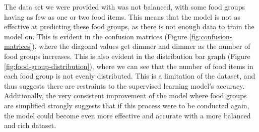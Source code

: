 \documentclass[11pt]{article}
\begin{document}
The data set we were provided with was not balanced, with some food groups having as few as one or two food items. This means that the model is not as effective at predicting these food groups, as there is not enough data to train the model on. This is evident in the confusion matrices (Figure \ref{fig:confusion-matrices}), where the diagonal values get dimmer and dimmer as the number of food groups increases. This is also evident in the distribution bar graph (Figure \ref{fig:food-group-distribution}), where we can see that the number of food items in each food group is not evenly distributed. This is a limitation of the dataset, and thus suggests there are restraints to the supervised learning model's accuracy. Additionally, the very consistent improvement of the model where food groups are simplified strongly suggests that if this process were to be conducted again, the model could become even more effective and accurate with a more balanced and rich dataset.




\newpage


\end{document}

